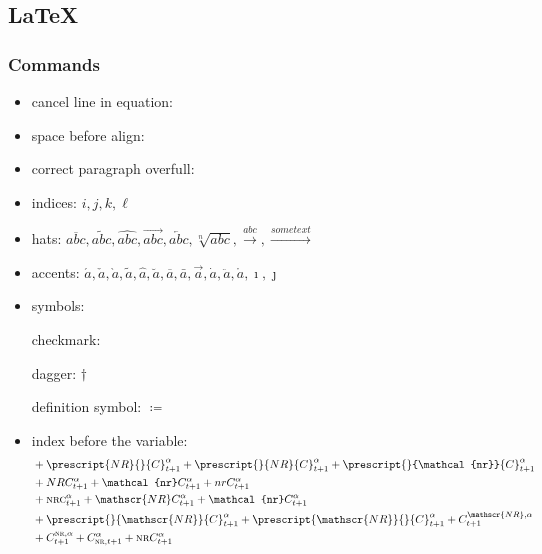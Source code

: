 \documentclass[
thesis.tex
]{subfiles}
\begin{document}
\newpage

\subsection{\LaTeX}

\subsubsection*{Commands}

\begin{itemize}
	
	\item cancel line in equation: 
	
	
	\item space before align:  %
	
	\item correct paragraph overfull: 
	
	\item indices: $i,j,k,\ell$
	
	\item hats: \( \overline{abc}, \widetilde{abc}, \widehat{abc}, \overrightarrow{abc}, \overleftarrow{abc}, \sqrt[n]{abc}, \xrightarrow{abc}, \xrightarrow{some text}\)
	
	\item accents: \(\acute{a}, \check{a}, \grave{a}, \widetilde{a}, \hat{a}, \breve{a}, \overline{a}, \bar{a}, \vec{a}, \dot{a}, \ddot{a}, \mathring{a}, \imath, \jmath\)
	
	\item symbols:
	
	checkmark: \checkmark 
	
	dagger: $\dagger$
	
	definition symbol: $\coloneq$
	
	\item index before the variable:
	\begin{align*}
		& + \prescript{NR}{}{C}^{\alpha}_{t+1} + \prescript{}{NR}{C}^{\alpha}_{t+1} + \prescript{}{\mathcal{nr}}{C}^{\alpha}_{t+1}        
		\\
		& + NRC^{\alpha}_{t+1} + \mathcal{nr}C^{\alpha}_{t+1} + nrC^{\alpha}_{t+1}
		\\
		& + \textsc{nrc}^{\alpha}_{t+1} + \mathscr{NR}C^{\alpha}_{t+1} + \mathcal{nr}C^{\alpha}_{t+1}
		\\
		& + \prescript{}{\mathscr{NR}}{C}^{\alpha}_{t+1} + \prescript{\mathscr{NR}}{}{C}^{\alpha}_{t+1} + {C}^{\mathscr{NR},\alpha}_{t+1} 
		\\
		& + {C}^{\textsc{nr},\alpha}_{t+1} + {C}^{\alpha}_{\textsc{nr},t+1} + \textsc{nr}C^{\alpha}_{t+1}
	\end{align*}
	

\end{itemize}
\end{document}
